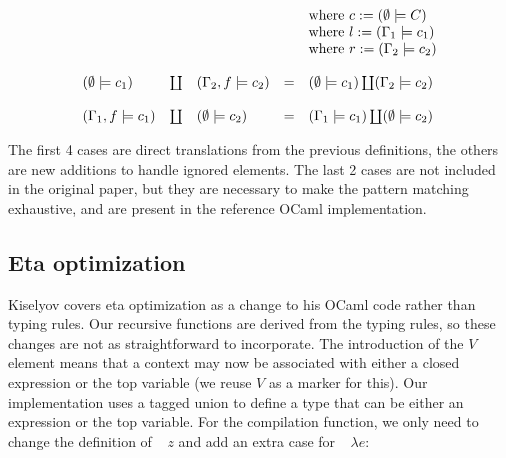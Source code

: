 \documentclass[conference]{IEEEtran}
\DeclareMathOperator{\lazyeta}{lazy_\eta}
\begin{document}
\begin{equation*}
\begin{array}{l l l l l}
                                 &         &                          &   & \text{where } c := (\emptyset \models C )                \\
                                 &         &                          &   & \text{where } l := (\Gamma_1 \models c_1 )               \\
                                 &         &                          &   & \text{where } r := (\Gamma_2 \models c_2 )               \\
        \\
        (\emptyset \models c_1)  & \coprod & (\Gamma_2,f \models c_2) & = & (\emptyset \models c_1) \coprod (\Gamma_2 \models c_2)   \\
        \\
        (\Gamma_1,f \models c_1) & \coprod & (\emptyset \models c_2)  & = & (\Gamma_1 \models c_1) \coprod (\emptyset \models c_2)   \\
    \end{array}
\end{equation*}

The first 4 cases are direct translations from the previous definitions, the others are new additions to handle ignored elements.
The last 2 cases are not included in the original paper, but they are necessary to make the pattern matching exhaustive, and are present in the reference OCaml implementation.

\subsection{Eta optimization}
Kiselyov covers eta optimization as a change to his OCaml code rather than typing rules.
Our recursive functions are derived from the typing rules, so these changes are not as straightforward to incorporate.
The introduction of the $V$ element means that a context may now be associated with either a closed expression or the top variable (we reuse $V$ as a marker for this).
Our implementation uses a tagged union to define a type that can be either an expression or the top variable.
For the compilation function, we only need to change the definition of $\lazyeta \ z$ and add an extra case for $\lazyeta \ \lambda e$:
\end{document}
